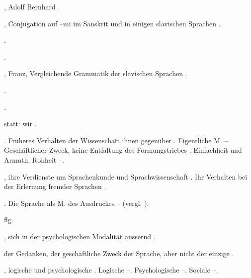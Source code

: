 \begin{register}
, Adolf Bernhard \pageref{sp.280}.



, Conjugation auf –mi im Sanskrit und in einigen slavischen Sprachen \pageref{sp.186}.

 \pageref{sp.257}.

 \pageref{sp.322}.

, Franz, Vergleichende Grammatik der slavischen Sprachen \pageref{sp.173}.

 \pageref{sp.163}.

 \pageref{sp.147}.


 statt: wir \pageref{sp.202}.


. Früheres Verhalten der Wissenschaft ihnen gegenüber \pageref{sp.158}. Eigentliche M. \pageref{sp.278}–\pageref{sp.283}. Geschäftlicher Zweck, keine Entfaltung des Formungstriebes \pageref{sp.366}. Einfachheit und Armuth, Rohheit \pageref{sp.406}–\pageref{sp.407}.

, ihre Verdienste um Sprachenkunde und Sprachwissenschaft \pageref{sp.25}. Ihr Verhalten bei der Erlernung fremder Sprachen \pageref{sp.68}.


. Die Sprache als M. des Ausdruckes \pageref{sp.84}–\pageref{sp.86} (vergl. ).


 \pageref{sp.318} flg.

, sich in der psychologischen Modalität äussernd \pageref{sp.473}.

 der Gedanken, der geschäftliche Zweck der Sprache, aber nicht der einzige \pageref{sp.362}.


, logische und psychologische \pageref{sp.103}. Logische \pageref{sp.470}–\pageref{sp.472}. Psychologische \pageref{sp.472}–\pageref{sp.474}. Sociale \pageref{sp.474}–\pageref{sp.475}.


\end{register}
